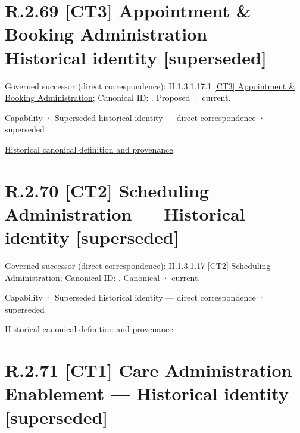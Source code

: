 \section*{R.2.69 [CT3] Appointment \& Booking Administration — Historical identity [superseded]}
\label{navigation:R.2.69}

{\small Governed successor (direct correspondence): II.1.3.1.17.1 \hyperref[element:7b3ba9bcac564dd4a7a08631581db2ca]{[CT3] Appointment \& Booking Administration}; Canonical ID: \texttt{}. Proposed · current.}\par
\label{element:cdc16dd0f84049f8af3f1ec76f1e1428}
{\small Capability · Superseded historical identity — direct correspondence · superseded}\par
\href{../../../../../../../continuum/strategy/capability/cdc16dd0f84049f8af3f1ec76f1e1428.md}{Historical canonical definition and provenance}.\par
\section*{R.2.70 [CT2] Scheduling Administration — Historical identity [superseded]}
\label{navigation:R.2.70}

{\small Governed successor (direct correspondence): II.1.3.1.17 \hyperref[element:35fb3744c900470f9895056246a13fb1]{[CT2] Scheduling Administration}; Canonical ID: \texttt{}. Canonical · current.}\par
\label{element:1a6630940ffb44fcad4543b93a367b67}
{\small Capability · Superseded historical identity — direct correspondence · superseded}\par
\href{../../../../../../../continuum/strategy/capability/1a6630940ffb44fcad4543b93a367b67.md}{Historical canonical definition and provenance}.\par
\section*{R.2.71 [CT1] Care Administration Enablement — Historical identity [superseded]}
\label{navigation:R.2.71}

